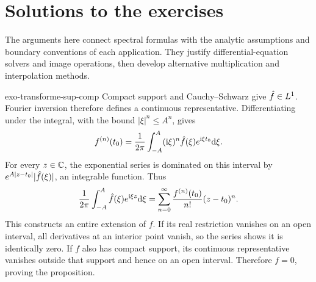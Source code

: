 \clearpage
\section{Solutions to the exercises}
\label{sec-solutions-4-appli-dft}

The arguments here connect spectral formulas with the analytic assumptions
and boundary conventions of each application. They justify
differential-equation solvers and image operations, then develop alternative
multiplication and interpolation methods.

\begin{correction}{exo-transforme-sup-comp}
Compact support and Cauchy--Schwarz give $\hat{f}\in L^1$. Fourier inversion
therefore defines a continuous representative. Differentiating under the
integral, with the bound $|\xi|^n\leq A^n$, gives
\[
 f^{(n)}(t_0)=\frac1{2\pi}\int_{-A}^A
             (\mathrm{i}\xi)^n\hat{f}(\xi)e^{\mathrm{i}\xi t_0}\mathrm{d}\xi.
\]
For every $z\in\mathbb{C}$, the exponential series is dominated on this interval by
$e^{A|z-t_0|}|\hat{f}(\xi)|$, an integrable function. Thus
\[
 \frac1{2\pi}\int_{-A}^A\hat{f}(\xi)e^{\mathrm{i}\xi z}\mathrm{d}\xi
 =\sum_{n=0}^\infty\frac{f^{(n)}(t_0)}{n!}(z-t_0)^n.
\]
This constructs an entire extension of $f$. If its real restriction vanishes
on an open interval, all derivatives at an interior point vanish, so the
series shows it is identically zero. If $f$ also has compact support,
its continuous representative vanishes outside that support and hence on an
open interval. Therefore $f=0$, proving the proposition.
\end{correction}


